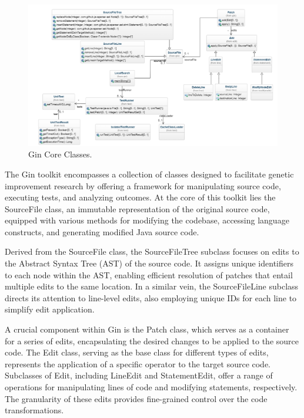 \begin{figure}[h]
  \centering
  \includegraphics[width=1.0\textwidth]{img/Gin_Core_Classes.png}
  \caption{Gin Core Classes.~\cite{DBLP:conf/gecco/BrownleePABWW19}}
  \label{fig:Gin_Core_Classes}
\end{figure}



The Gin toolkit encompasses a collection of classes designed to facilitate genetic improvement research by offering a framework for manipulating source code, executing tests, and analyzing outcomes. At the core of this toolkit lies the SourceFile class, an immutable representation of the original source code, equipped with various methods for modifying the codebase, accessing language constructs, and generating modified Java source code.\par

Derived from the SourceFile class, the SourceFileTree subclass focuses on edits to the Abstract Syntax Tree (AST) of the source code. It assigns unique identifiers to each node within the AST, enabling efficient resolution of patches that entail multiple edits to the same location. In a similar vein, the SourceFileLine subclass directs its attention to line-level edits, also employing unique IDs for each line to simplify edit application.\par

A crucial component within Gin is the Patch class, which serves as a container for a series of edits, encapsulating the desired changes to be applied to the source code. The Edit class, serving as the base class for different types of edits, represents the application of a specific operator to the target source code. Subclasses of Edit, including LineEdit and StatementEdit, offer a range of operations for manipulating lines of code and modifying statements, respectively. The granularity of these edits provides fine-grained control over the code transformations.\par

